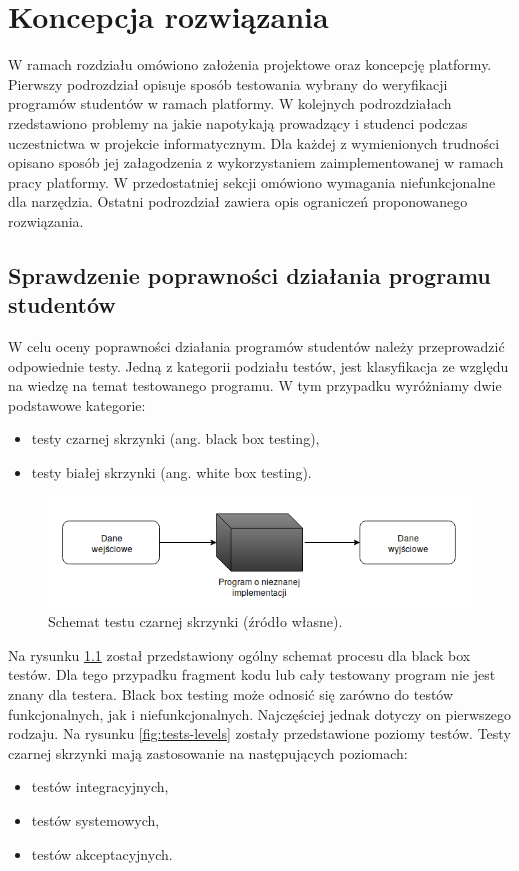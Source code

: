 \chapter{Koncepcja rozwiązania}
\label{chapter:requirements}

W ramach rozdziału omówiono założenia projektowe oraz koncepcję platformy.
Pierwszy podrozdział opisuje sposób testowania wybrany do weryfikacji programów studentów w ramach platformy.
W kolejnych podrozdziałach rzedstawiono problemy na jakie napotykają prowadzący i studenci podczas uczestnictwa w projekcie informatycznym.
Dla każdej z wymienionych trudności opisano sposób jej załagodzenia z wykorzystaniem zaimplementowanej w ramach pracy platformy.
W przedostatniej sekcji omówiono wymagania niefunkcjonalne dla narzędzia.
Ostatni podrozdział zawiera opis ograniczeń proponowanego rozwiązania.

\section{Sprawdzenie poprawności działania programu studentów}

W celu oceny poprawności działania programów studentów należy przeprowadzić odpowiednie testy.
Jedną z kategorii podziału testów, jest klasyfikacja ze względu na wiedzę na temat testowanego programu.
W tym przypadku wyróżniamy dwie podstawowe kategorie:
\begin{itemize}
    \item testy czarnej skrzynki (ang. black box testing),
    \item testy białej skrzynki (ang. white box testing).
\end{itemize}

\begin{figure}[h]
    \centering
    \includegraphics[width = 13cm]{chapter02/black-box.png}
    \caption{Schemat testu czarnej skrzynki (źródło własne).}
    \label{fig:black-box}
\end{figure}

Na rysunku \ref{fig:black-box} został przedstawiony ogólny schemat procesu dla black box testów.
Dla tego przypadku fragment kodu lub cały testowany program nie jest znany dla testera.
Black box testing może odnosić się zarówno do testów funkcjonalnych, jak i niefunkcjonalnych.
Najczęściej jednak dotyczy on pierwszego rodzaju.
Na rysunku \ref{fig:tests-levels} zostały przedstawione poziomy testów.
Testy czarnej skrzynki mają zastosowanie na następujących poziomach:
\begin{itemize}
    \item testów integracyjnych,
    \item testów systemowych,
    \item testów akceptacyjnych.
\end{itemize}

